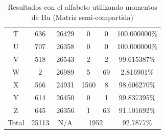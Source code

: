 \documentclass[a4paper, 11pt, oneside]{report}
\begin{document}
\begin{table}
\begin{tabular}{|c|c|c|c|c|c|}
	T & 636 & 26429 & 0 & 0 & 100.000000\% \\ 
	U & 707 & 26358 & 0 & 0 & 100.000000\% \\ 
	V & 518 & 26543 & 2 & 2 & 99.615387\% \\ 
	W & 2 & 26989 & 5 & 69 & 2.816901\% \\ 
	X & 566 & 24931 & 1560 & 8 & 98.606270\% \\ 
	Y & 614 & 26450 & 0 & 1 & 99.837395\% \\ 
	Z & 645 & 26356 & 1 & 63 & 91.101692\% \\ 
	\hline
	Total & 25113 & N/A & \multicolumn{2}{|c|}{1952} & 92.7877\% \\
	\hline
\end{tabular}
\caption{Resultados con el alfabeto utilizando momentos de Hu (Matriz semi-compartida)}
\label{tb:alphaHuShared}
\end{table}
\end{document}
